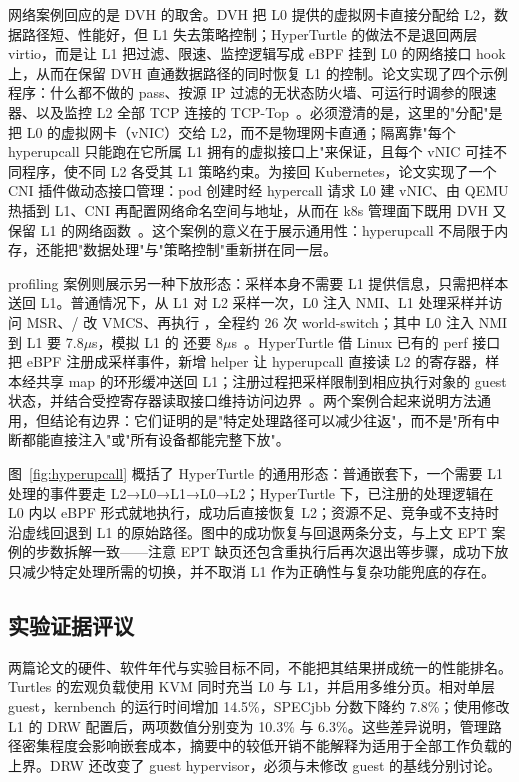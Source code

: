 网络案例回应的是 DVH 的取舍。DVH 把 L0 提供的虚拟网卡直接分配给 L2，数据路径短、性能好，但 L1 失去策略控制；HyperTurtle 的做法不是退回两层 virtio，而是让 L1 把过滤、限速、监控逻辑写成 eBPF 挂到 L0 的网络接口 hook 上，从而在保留 DVH 直通数据路径的同时恢复 L1 的控制。论文实现了四个示例程序：什么都不做的 pass、按源 IP 过滤的无状态防火墙、可运行时调参的限速器、以及监控 L2 全部 TCP 连接的 TCP-Top~\cite{source8}。必须澄清的是，这里的"分配"是把 L0 的虚拟网卡（vNIC）交给 L2，而不是物理网卡直通；隔离靠"每个 hyperupcall 只能跑在它所属 L1 拥有的虚拟接口上"来保证，且每个 vNIC 可挂不同程序，使不同 L2 各受其 L1 策略约束。为接回 Kubernetes，论文实现了一个 CNI 插件做动态接口管理：pod 创建时经 hypercall 请求 L0 建 vNIC、由 QEMU 热插到 L1、CNI 再配置网络命名空间与地址，从而在 k8s 管理面下既用 DVH 又保留 L1 的网络函数~\cite{source8}。这个案例的意义在于展示通用性：hyperupcall 不局限于内存，还能把"数据处理"与"策略控制"重新拼在同一层。

profiling 案例则展示另一种下放形态：采样本身不需要 L1 提供信息，只需把样本送回 L1。普通情况下，从 L1 对 L2 采样一次，L0 注入 NMI、L1 处理采样并访问 MSR、/ 改 VMCS、再执行 ，全程约 26 次 world-switch；其中 L0 注入 NMI 到 L1 要 7.8$\mu$s，模拟 L1 的  还要 8$\mu$s~\cite{source8}。HyperTurtle 借 Linux 已有的 perf 接口把 eBPF 注册成采样事件，新增 helper  让 hyperupcall 直接读 L2 的寄存器，样本经共享 map 的环形缓冲送回 L1；注册过程把采样限制到相应执行对象的 guest 状态，并结合受控寄存器读取接口维持访问边界~\cite{source8}。两个案例合起来说明方法通用，但结论有边界：它们证明的是"特定处理路径可以减少往返"，而不是"所有中断都能直接注入"或"所有设备都能完整下放"。



图~\ref{fig:hyperupcall} 概括了 HyperTurtle 的通用形态：普通嵌套下，一个需要 L1 处理的事件要走 L2→L0→L1→L0→L2；HyperTurtle 下，已注册的处理逻辑在 L0 内以 eBPF 形式就地执行，成功后直接恢复 L2；资源不足、竞争或不支持时沿虚线回退到 L1 的原始路径。图中的成功恢复与回退两条分支，与上文 EPT 案例的步数拆解一致——注意 EPT 缺页还包含重执行后再次退出等步骤，成功下放只减少特定处理所需的切换，并不取消 L1 作为正确性与复杂功能兜底的存在。

\subsection{实验证据评议}\label{sec:nested-eval}

两篇论文的硬件、软件年代与实验目标不同，不能把其结果拼成统一的性能排名。Turtles 的宏观负载使用 KVM 同时充当 L0 与 L1，并启用多维分页。相对单层 guest，kernbench 的运行时间增加 14.5\%，SPECjbb 分数下降约 7.8\%；使用修改 L1 的 DRW 配置后，两项数值分别变为 10.3\% 与 6.3\%\cite[\S4.1, Table 2]{source7}。这些差异说明，管理路径密集程度会影响嵌套成本，摘要中的较低开销不能解释为适用于全部工作负载的上界。DRW 还改变了 guest hypervisor，必须与未修改 guest 的基线分别讨论。

